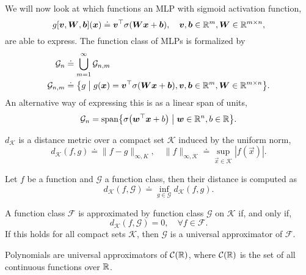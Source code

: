 We will now look at which functions an MLP with sigmoid activation function, \[
    g[\bm{v},\bm{W},\bm{b}](\bm{x}) \doteq \bm{v}^\top \sigma(\bm{W}\bm{x} + \bm{b}), \quad \bm{v}, \bm{b} \in \mathbb{R}^m, \bm{W} \in \mathbb{R}^{m\times n},
\]
are able to express. The function class of MLPs is formalized by
\begin{align*}
    \mathcal{G}_n     & \doteq \bigcup_{m=1}^\infty \mathcal{G}_{n,m}                                                                                                                 \\
    \mathcal{G}_{n,m} & \doteq \lft\{ g \;\middle|\; g(\vec{x}) = \transpose{\vec{v}} \sigma(\mat{W}\vec{x} + \vec{b}), \vec{v}, \vec{b} \in \R^m, \mat{W} \in \R^{m\times n} \rgt\}.
\end{align*}
An alternative way of expressing this is as a linear span of units, \[
    \mathcal{G}_n = \mathrm{span} \lft\{ \sigma \lft( \transpose{\vec{w}}\vec{x} + b \rgt) \;\middle|\; \vec{w} \in \R^n, b \in \R \rgt\}.
\]

\begin{definition}
    $d_{\mathcal{K}}$ is a distance metric over a compact set $\mathcal{K}$ induced by the uniform norm, \[
        d_{\mathcal{K}}(f,g) \doteq \| f - g \|_{\infty,K}, \quad \| f \|_{\infty,\mathcal{K}} \doteq \sup_{\vec{x} \in \mathcal{K}} |f(\vec{x})|.
    \]
\end{definition}

\begin{definition}
    Let $f$ be a function and $\mathcal{G}$ a function class, then their distance is computed as \[
        d_{\mathcal{K}}(f,\mathcal{G}) \doteq \inf_{g \in \mathcal{G}} d_{\mathcal{K}}(f,g).
    \]
\end{definition}

\begin{definition}
    A function class $\mathcal{F}$ is approximated by function class $\mathcal{G}$ on $\mathcal{K}$ if, and only if, \[
        d_{\mathcal{K}}(f, \mathcal{G}) = 0, \quad \forall f \in \mathcal{F}.
    \]
    If this holds for all compact sets $\mathcal{K}$, then $\mathcal{G}$ is a universal approximator of
    $\mathcal{F}$.
\end{definition}

\begin{theorem}
    Polynomials are universal approximators of $\mathcal{C}(\mathbb{R})$, where $\mathcal{C}(\mathbb{R})$ is the set
    of all continuous functions over $\mathbb{R}$.
\end{theorem}


